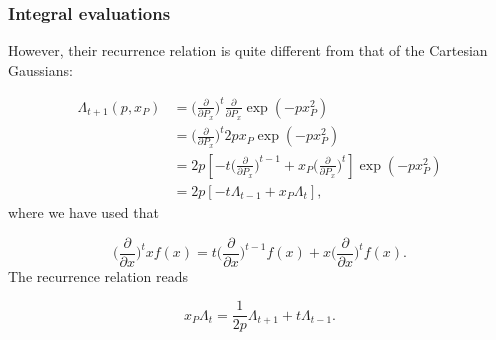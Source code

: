 \documentclass{beamer}
\begin{document}
\begin{frame}
\frametitle{Integral evaluations}

\begin{block}{}

However, their recurrence relation is quite different from that of the Cartesian Gaussians:

\begin{equation}
\begin{split}
 \Lambda_{t+1}(p,x_P) & = \Big(\frac{\partial}{\partial P_x}\Big)^t \frac{\partial}{\partial P_x}\exp(-px^2_P) \\
                      & = \Big(\frac{\partial}{\partial P_x}\Big)^t 2px_P \exp(-px^2_P)  \\
                      & = 2p[-t\Big(\frac{\partial}{\partial P_x}\Big)^{t-1} + x_P \Big(\frac{\partial}{\partial P_x}\Big)^t] \exp(-px^2_P) \\
                      & = 2p[-t\Lambda_{t-1} + x_P \Lambda_t],
\end{split}
\end{equation}
where we have used that

\begin{equation}
\label{eq:derivation_rule}
 \Big(\frac{\partial}{\partial x}\Big)^t x f(x) = t\Big(\frac{\partial}{\partial x}\Big)^{t-1}f(x) + x\Big(\frac{\partial}{\partial x}\Big)^t f(x).
\end{equation}
The recurrence relation reads

\begin{equation}
\label{eq:hermite_gaussian_recurrence}
 x_P \Lambda_t = \frac{1}{2p}\Lambda_{t+1} + t\Lambda_{t-1}.
\end{equation}
\end{block}
\end{frame}
\end{document}
